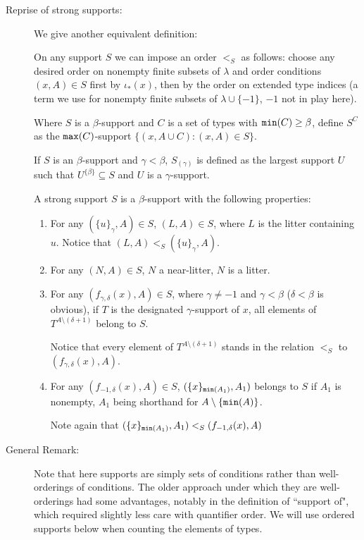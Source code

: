 \documentclass[112pt]{article}
\begin{document}
\begin{description}
\item[Reprise of strong supports:]  We give another equivalent definition:

On any support $S$ we can impose an order $<_S$ as follows:  choose any desired order on nonempty finite subsets of $\lambda$ and order conditions $(x,A)\in S$ first by $\iota_*(x)$, then by the order on extended type indices (a term we use for nonempty finite subsets of $\lambda \cup \{-1\}$, $-1$ not in play here).

Where $S$ is a $\beta$-support and $C$ is a set of types with ${\tt min}(C) \geq \beta$, define
$S^C$ as the ${\tt max}(C)$-support $\{(x,A \cup C):(x,A) \in S\}$.

If $S$ is an $\beta$-support and $\gamma<\beta$, $S_{(\gamma)}$ is defined as the largest support $U$ such that $U^{\{\beta\}} \subseteq S$ and $U$ is a $\gamma$-support.

A strong support $S$ is a $\beta$-support with the following properties:

\begin{enumerate}

\item  For any $(\{u\}_\gamma,A) \in S$, $(L,A) \in S$, where $L$ is the litter containing $u$.  Notice
that $(L,A) <_S (\{u\}_\gamma,A)$.

\item   For any $(N,A) \in S$, $N$ a near-litter, $N$ is a litter.

\item  For any $(f_{\gamma,\delta}(x),A) \in S$, where $\gamma \neq -1$ and $\gamma < \beta$ ($\delta<\beta$ is obvious),
if $T$ is the designated $\gamma$-support of $x$, all elements of $T^{A \setminus (\delta+1)}$ belong to $S$.

Notice that every element of $T^{A \setminus (\delta+1)}$ stands in the relation $<_S$ to $(f_{\gamma,\delta}(x),A)$.

\item For any $(f_{-1,\delta}(x),A) \in S$, $(\{x\}_{{\tt min}(A_1)},A_1)$ belongs to $S$
if $A_1$ is nonempty,  $A_1$ being shorthand for $A \setminus \{{\tt min}(A)\}$.

Note again that $(\{x\}_{{\tt min}(A_1)},A_1) <_S (f_{-1,\delta}(x),A)$

\end{enumerate}




\item[General Remark:]  Note that here supports are simply sets of conditions rather than well-orderings of conditions.  The older approach under which they are well-orderings had some advantages, notably in the definition of ``support of", which required slightly less care with quantifier order.  We will use ordered supports below when counting the elements of types.


\end{description}
\end{document}
